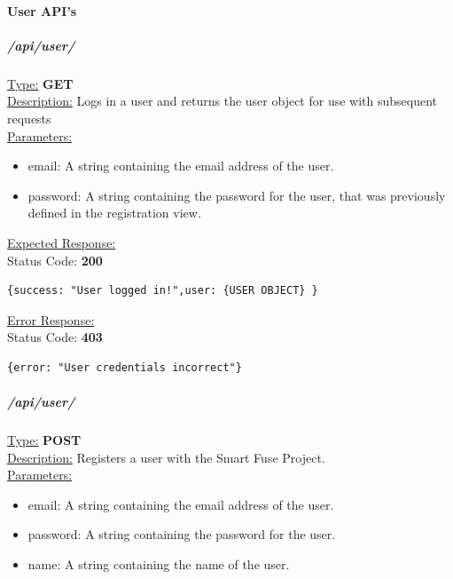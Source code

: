 \documentclass[preprint,12pt,3p]{elsarticle}
\newcommand{\forceindent}{\leavevmode{\parindent=1em\indent}}
\begin{document}
\paragraph{User API's}

\subparagraph*{/api/user/}
\underline{Type:} \textbf{GET}\\

\underline{Description:} Logs in a user and returns the user object for use with subsequent requests\\

\underline{Parameters:}
\begin{itemize}
\item email: A string containing the email address of the user.

\item password: A string containing the password for the user, that was previously defined in the registration view.

\end{itemize}

\underline{Expected Response:}\\[5pt]
\forceindent Status Code: \textbf{200} \\
\begin{verbatim}
{success: "User logged in!",user: {USER OBJECT} }
\end{verbatim}
\underline{Error Response:}\\[5pt]
\forceindent Status Code: \textbf{403} \\
\begin{verbatim}
{error: "User credentials incorrect"}
\end{verbatim}


\subparagraph*{/api/user/}


\underline{Type:} \textbf{POST}\\

\underline{Description:} Registers a user with the Smart Fuse Project.\\

\underline{Parameters:}
\begin{itemize}
\item email: A string containing the email address of the user.

\item password: A string containing the password for the user.

\item name: A string containing the name of the user.

\end{itemize}
\end{document}
